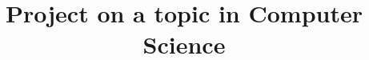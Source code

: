 \documentclass[a4paper, final]{oxcsproject}
\title{Project on a topic in Computer Science}
\begin{document}
\begin{romanpages}



	\maketitle


	\begin{acknowledgements}
		
	\end{acknowledgements}

	\begin{abstract}
		
	\end{abstract}

	\flushbottom

	\listoftodos

	\tableofcontents


	\newpage
	\printglossary[type=\acronymtype]

\end{romanpages}

\flushbottom
\end{document}
